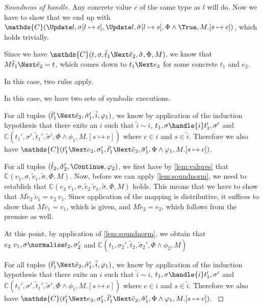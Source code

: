 \begin{proof}[Soundness of handle]
{Any concrete value $c$ of the same type as $l$ will do. Now we have to show that we end up with $\mathds{C}(\Update l,\sigma[l\mapsto c],\Update l,\tilde{\sigma}[l\mapsto s],\Phi\land\True,M.[s\mapsto c])$, which holds trivially.
}


 {
Since we have $\mathds{C}(t,\sigma,\tilde{t}_1\Next \tilde{e}_2,\tilde{\sigma},\Phi,M)$, we know that $M \tilde{t}_1\Next \tilde{e}_2=t$, which comes down to $t_1\Next e_2$ for some concrete $t_1$ and $e_2$.

 In this case, two rules apply.\\


{
In this case, we have two sets of symbolic executions.

For all tuples $(\tilde{t}_1'\Next \tilde{e}_2,\tilde{\sigma}_1',\tilde{i},\phi_1)$, we know by application of the induction hypothesis that
there exits an $i$ such that $\tilde{i}\sim i$, $t_1,\sigma\handle{i}t_1',\sigma'$ and
$\mathds{C}(t_1',\sigma',\tilde{t}_1',\tilde{\sigma}',\Phi\land\phi_1,M.[s\mapsto c])$ where $c\in i$ and $s\in \tilde{i}$.
Therefore we also have $\mathds{C}(t_1'\Next e_2,\sigma_1',\tilde{t}_1'\Next \tilde{e}_2,\tilde{\sigma}_1',\Phi\land\phi_1,M.[s\mapsto c])$.

For all tuples $(\tilde{t}_2,\tilde{\sigma}_2',\Continue,\phi_2)$, we first have by \cref{lem:valpres} that
$\mathds{C}(v_1,\sigma,\tilde{v}_1,\tilde{\sigma},\Phi,M)$.
Now, before we can apply \cref{lem:soundnorm}, we need to establish that
$\mathds{C}(e_2\ v_1,\sigma,\tilde{e}_2\ \tilde{v}_1,\tilde{\sigma},\Phi,M)$ holds.
This means that we have to show that $M \tilde{e}_2\ \tilde{v}_1 = e_2\ v_1$.
Since application of the mapping is distributive, it suffices to show that $M\tilde{v}_1=v_1$, which is given,
and $M\tilde{e}_2=e_2$, which follows from the premise as well.

At this point, by application of \cref{lem:soundnorm}, we obtain that $e_2\ v_1,\sigma\normalise t_2,\sigma_2'$
and $\mathds{C}(t_1,\sigma_2',\tilde{t}_2,\tilde{\sigma}_2',\Phi\land\phi_2,M)$
}
%
{
For all tuples $(\tilde{t}_1'\Next \tilde{e}_2,\tilde{\sigma}_1',\tilde{i},\phi_1)$, we know by application of the induction hypothesis that
there exits an $i$ such that $\tilde{i}\sim i$, $t_1,\sigma\handle{i}t_1',\sigma'$ and
$\mathds{C}(t_1',\sigma',\tilde{t}_1',\tilde{\sigma}',\Phi\land\phi_1,M.[s\mapsto c])$ where $c\in i$ and $s\in \tilde{i}$.
Therefore we also have $\mathds{C}(t_1'\Next e_2,\sigma_1',\tilde{t}_1'\Next \tilde{e}_2,\tilde{\sigma}_1',\Phi\land\phi_1,M.[s\mapsto c])$.
}
}


\end{proof}
